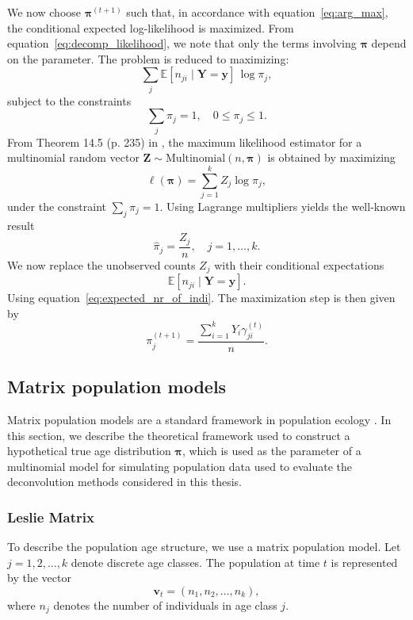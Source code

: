\documentclass[11pt,a4paper]{article}
\begin{document}
We now choose $\boldsymbol{\pi}^{(t+1)}$ such that, in accordance with equation~\ref{eq:arg_max}, the conditional expected log-likelihood is maximized. From equation~\ref{eq:decomp_likelihood}, we note that only the terms involving $\boldsymbol{\pi}$ depend on the parameter. The problem is reduced to maximizing:
\[
\sum_{j} \mathbb{E}[n_{ji} \mid \mathbf{Y} = \mathbf{y}] \, \log \pi_j,
\]
subject to the constraints
\[
\sum_{j} \pi_j = 1, \quad 0 \le \pi_j \le 1.
\]
From Theorem 14.5 (p. 235) in \cite{wasserman2004}, the maximum likelihood estimator for a multinomial random vector $\mathbf{Z} \sim \text{Multinomial}(n, \boldsymbol{\pi})$ is obtained by maximizing
\[
\ell(\boldsymbol{\pi}) = \sum_{j=1}^{k} Z_j \log \pi_j,
\]
under the constraint $\sum_j \pi_j = 1$. Using Lagrange multipliers yields the well-known result
\[
\hat{\pi}_j = \frac{Z_j}{n}, \quad j = 1,\dots,k.
\]
We now replace the unobserved counts $Z_j$ with their conditional expectations
\[
\mathbb{E}[n_{ji} \mid \mathbf{Y} = \mathbf{y}].
\]
Using equation~\eqref{eq:expected_nr_of_indi}. The maximization step is then given by
\begin{equation}
	\pi_{j}^{(t+1)} =  \frac{\sum_{i=1}^k Y_i \gamma_{ji}^{(t)}}{n}.
	\label{eq:maximization_step}
\end{equation}


\subsection{Matrix population models}\label{sec:pop_model_matrix}

Matrix population models are a standard framework in population ecology \parencite{caswell2001}. In this section, we describe the theoretical framework used to construct a hypothetical true age distribution $\boldsymbol{\pi}$, which is used as the parameter of a multinomial model for simulating population data used to evaluate the deconvolution methods considered in this thesis.

\subsubsection{Leslie Matrix}\label{sec:Leslie_Matrix}

To describe the population age structure, we use a matrix population model. Let $j = 1,2,\dots,k$ denote discrete age classes. The population at time $t$ is represented by the vector
\[
\mathbf{v}_t = (n_1, n_2, \dots, n_k),
\]
where $n_j$ denotes the number of individuals in age class $j$.
\end{document}
